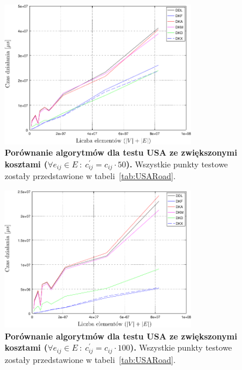 \begin{figure}[!htbp]
	\null\hfill
	\includegraphics[width=0.75\textwidth]{Chapter_IV/graphx10Cost_psfrag.pdf}
	\hfill\null
	\caption{
		\textbf{Porównanie algorytmów dla testu USA ze zwiększonymi kosztami ($\forall e_{ij} \in E \: : \: c^{'}_{ij} = c_{ij} \cdot 50$).}
		Wszystkie punkty testowe zostały przedstawione w tabeli~\ref{tab:USARoad}.
	}
	\label{fig:plotgraphx50Cost}
\end{figure}

\begin{figure}[!htbp]
	\null\hfill
	\includegraphics[width=0.75\textwidth]{Chapter_IV/graphx50Cost_psfrag.pdf}
	\hfill\null
	\caption{
		\textbf{Porównanie algorytmów dla testu USA ze zwiększonymi kosztami ($\forall e_{ij} \in E \: : \: c^{'}_{ij} = c_{ij} \cdot 100$).}
		Wszystkie punkty testowe zostały przedstawione w tabeli~\ref{tab:USARoad}.
	}
	\label{fig:plotgraphx100Cost}
\end{figure}

